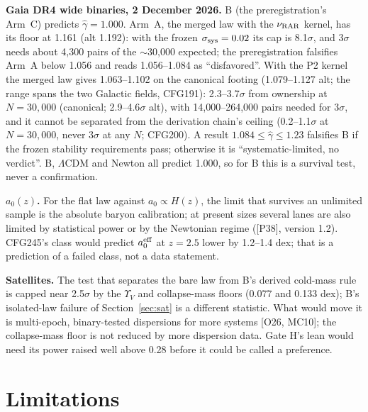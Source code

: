 \documentclass[10pt]{article}
\begin{document}
\textbf{Gaia DR4 wide binaries, 2 December 2026.} B (the preregistration's Arm~C) predicts $\hat\gamma=1.000$. Arm~A, the merged law with the $\nu_{\rm RAR}$ kernel, has its floor at 1.161 (alt 1.192): with the frozen $\sigma_{\rm sys}=0.02$ its cap is 8.1$\sigma$, and $3\sigma$ needs about 4,300 pairs of the $\sim$30,000 expected; the preregistration falsifies Arm~A below 1.056 and reads 1.056--1.084 as ``disfavored''. With the P2 kernel the merged law gives 1.063--1.102 on the canonical footing (1.079--1.127 alt; the range spans the two Galactic fields, CFG191): 2.3--3.7$\sigma$ from ownership at $N=30{,}000$ (canonical; 2.9--4.6$\sigma$ alt), with 14,000--264,000 pairs needed for $3\sigma$, and it cannot be separated from the derivation chain's ceiling (0.2--1.1$\sigma$ at $N=30{,}000$, never $3\sigma$ at any $N$; CFG200). A result $1.084\le\hat\gamma\le1.23$ falsifies B if the frozen stability requirements pass; otherwise it is ``systematic-limited, no verdict''. B, $\Lambda$CDM and Newton all predict 1.000, so for B this is a survival test, never a confirmation.

\textbf{$a_0(z)$.} For the flat law against $a_0\propto H(z)$, the limit that survives an unlimited sample is the absolute baryon calibration; at present sizes several lanes are also limited by statistical power or by the Newtonian regime ([P38], version 1.2). CFG245's class would predict $a_0^{\rm eff}$ at $z=2.5$ lower by 1.2--1.4 dex; that is a prediction of a failed class, not a data statement.

\textbf{Satellites.} The test that separates the bare law from B's derived cold-mass rule is capped near 2.5$\sigma$ by the $\Upsilon_V$ and collapse-mass floors (0.077 and 0.133 dex); B's isolated-law failure of Section~\ref{sec:sat} is a different statistic. What would move it is multi-epoch, binary-tested dispersions for more systems [O26, MC10]; the collapse-mass floor is not reduced by more dispersion data. Gate H's lean would need its power raised well above 0.28 before it could be called a preference.

\section{Limitations}\label{sec:lim}
\end{document}
